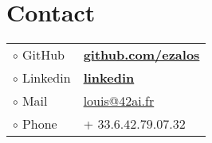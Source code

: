 \section{Contact}
	\begin{tabular} { l l }
	$ \circ $ GitHub & \href{https://github.com/ezalos}{\bf github.com/ezalos} \\
	$ \circ $ Linkedin & \href{https://www.linkedin.com/in/louis-d-7b3610203/}{\bf linkedin} \\
	$ \circ $ Mail & \href{mailto:louis@42ai.fr}{louis@42ai.fr} \\
	$ \circ $ Phone & + $33.6.42.79.07.32$ \\
	\end{tabular}
\sectionspace %
